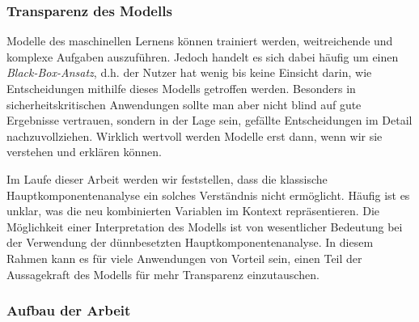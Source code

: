 

\subsubsection{Transparenz des Modells}

Modelle des maschinellen Lernens können trainiert werden, weitreichende und komplexe Aufgaben auszuführen. Jedoch handelt es sich dabei häufig um einen \textit{Black-Box-Ansatz}, d.h. der Nutzer hat wenig bis keine Einsicht darin, wie Entscheidungen mithilfe dieses Modells getroffen werden. Besonders in sicherheitskritischen Anwendungen sollte man aber nicht blind auf gute Ergebnisse vertrauen, sondern in der Lage sein, gefällte Entscheidungen im Detail nachzuvollziehen. Wirklich wertvoll werden Modelle erst dann, wenn wir sie verstehen und erklären können.

Im Laufe dieser Arbeit werden wir feststellen, dass die klassische Hauptkomponentenanalyse ein solches Verständnis nicht ermöglicht. Häufig ist es unklar, was die neu kombinierten Variablen im Kontext repräsentieren. Die Möglichkeit einer Interpretation des Modells ist von wesentlicher Bedeutung bei der Verwendung der dünnbesetzten Hauptkomponentenanalyse. In diesem Rahmen kann es für viele Anwendungen von Vorteil sein, einen Teil der Aussagekraft des Modells für mehr Transparenz einzutauschen.




\subsubsection{Aufbau der Arbeit}

